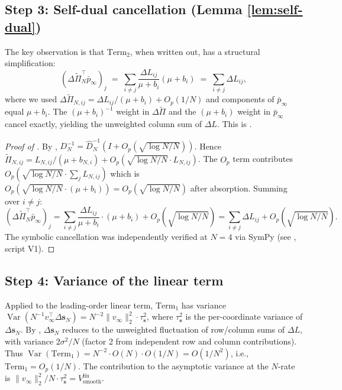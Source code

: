 \documentclass[11pt,a4paper]{article}
\theoremstyle{definition}
\newcommand{\Vsmooth}{V_{\mathrm{smooth}}}
\newcommand{\DPi}{\Delta\widetilde{\Pi}}
\newcommand{\pbarinf}{{\bar p}_{\infty}}
\DeclareMathOperator{\Var}{Var}
\begin{document}
\subsection{Step 3: Self-dual cancellation (Lemma \ref{lem:self-dual})}

The key observation is that $\mathrm{Term}_2$, when written out, has a
structural simplification:
\[
(\DPi_N^\top\pbarinf)_j\;=\;\sum_{i\neq j}\frac{\Delta L_{ij}}{\mu+b_i}(\mu+b_i)\;=\;\sum_{i\neq j}\Delta L_{ij},
\]
where we used $\DPi_{N,ij} = \Delta L_{ij}/(\mu+b_i) + O_p(1/N)$ and
components of $\pbarinf$ equal $\mu+b_i$. The $(\mu+b_i)^{-1}$ weight in $\DPi$ and the
$(\mu+b_i)$ weight in $\pbarinf$ cancel exactly, yielding the unweighted
column sum of $\Delta L$. This is .

\begin{proof}[Proof of ]
By , $D_N^{-1} = \hat D_N^{-1}(I + O_p(\sqrt{\log N/N}))$.
Hence $\widetilde\Pi_{N,ij} = L_{N,ij}/(\mu+b_{N,i}) + O_p(\sqrt{\log N/N}\cdot L_{N,ij})$.
The $O_p$ term contributes $O_p(\sqrt{\log N/N}\cdot\sum_j L_{N,ij})$ which is
$O_p(\sqrt{\log N/N}\cdot(\mu+b_i)) = O_p(\sqrt{\log N/N})$ after absorption.
Summing over $i\neq j$:
\[
(\DPi_N^\top\pbarinf)_j = \sum_{i\neq j}\frac{\Delta L_{ij}}{\mu+b_i}\cdot(\mu+b_i) + O_p(\sqrt{\log N/N}) = \sum_{i\neq j}\Delta L_{ij} + O_p(\sqrt{\log N/N}).
\]
The symbolic cancellation was independently verified at $N = 4$ via SymPy
(see , script V1).
\end{proof}

\subsection{Step 4: Variance of the linear term}

Applied to the leading-order linear term, $\mathrm{Term}_1$ has variance
$\Var(N^{-1}v_\infty^\top\Delta\mathbf s_N) = N^{-2}\|v_\infty\|_2^2\cdot\tau_{\mathbf s}^2$,
where $\tau_{\mathbf s}^2$ is the per-coordinate variance of
$\Delta\mathbf s_N$. By , $\Delta\mathbf s_N$ reduces to
the unweighted fluctuation of row/column sums of $\Delta L$, with variance
$2\sigma^2/N$ (factor 2 from independent row and column contributions).
Thus $\Var(\mathrm{Term}_1) = N^{-2}\cdot O(N)\cdot O(1/N) = O(1/N^2)$, i.e.,
$\mathrm{Term}_1 = O_p(1/N)$. The contribution to the asymptotic variance at
the $N$-rate is $\|v_\infty\|_2^2/N\cdot\tau_{\mathbf s}^2 = \Vsmooth^{\mathrm{lin}}$.
\end{document}
